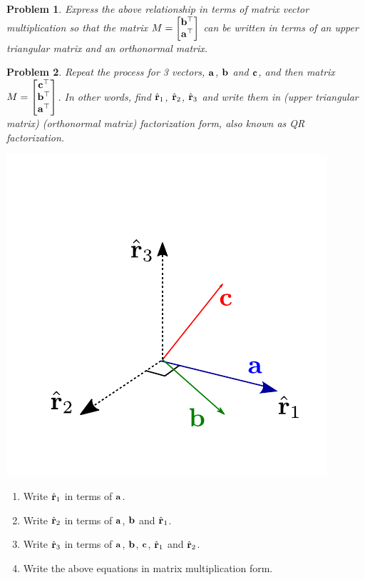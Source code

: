 \documentclass[times,singlecolumn]{article}
\newtheorem{prob}{Problem}
\begin{document}
\newpage
\vspace{10em}
\begin{prob}
  Express the above relationship in terms of matrix vector multiplication so
  that the matrix $M = \begin{bmatrix}
    \mathbf{b}^\top \\ \mathbf{a}^\top\end{bmatrix}$ can be written in terms of an upper
  triangular matrix and an orthonormal matrix.
\end{prob}

\vspace{10em}

\newpage
\begin{prob}
  Repeat the process for 3 vectors, $\mathbf{a}$, $\mathbf{b}$ and $\mathbf{c}$, and then matrix
  $M = \begin{bmatrix} \mathbf{c}^\top \\ \mathbf{b}^\top \\ \mathbf{a}^\top\end{bmatrix}$. In
  other words, find $\hat{\mathbf{r}}_1$, $\hat{\mathbf{r}}_2$, $\hat{\mathbf{r}}_3$ and write
  them in (upper triangular matrix) (orthonormal matrix) factorization form,
  also known as QR factorization.
\end{prob}
\hfill\includegraphics[width=0.5\linewidth]{media/gram-schmidt-3D.pdf}

\begin{enumerate}
  \item Write $\hat{\mathbf{r}}_1$ in terms of $\mathbf{a}$.
    \vspace{10em}
  \item Write $\hat{\mathbf{r}}_2$ in terms of $\mathbf{a}$, $\mathbf{b}$ and $\hat{\mathbf{r}}_1$.
    \vspace{10em}
  \item Write $\hat{\mathbf{r}}_3$ in terms of $\mathbf{a}$, $\mathbf{b}$, $\mathbf{c}$, $\hat{\mathbf{r}}_1$
    and $\hat{\mathbf{r}}_2$.
    \vspace{10em}

\newpage

\item Write the above equations in matrix multiplication form.
  \vspace{10em}
\end{enumerate}
\end{document}
